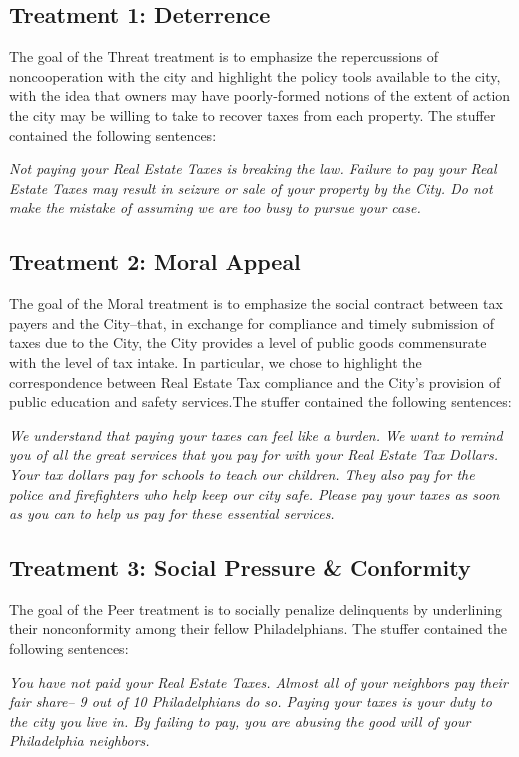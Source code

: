 \documentclass[12pt,titlepage]{article}
\begin{document}
\subsection{Treatment 1: Deterrence}

The goal of the Threat treatment is to emphasize the repercussions of
noncooperation with the city and highlight the policy tools available
to the city, with the idea that owners may have poorly-formed notions
of the extent of action the city may be willing to take to recover
taxes from each property. The stuffer contained the following sentences:

{\it Not paying your Real Estate Taxes is breaking the law. Failure to pay your Real Estate Taxes may result in
seizure or sale of your property by the City. Do not make the mistake of assuming we are too busy
to pursue your case.}

\subsection{Treatment 2: Moral Appeal}

The goal of the Moral treatment is to emphasize the social contract
between tax payers and the City--that, in exchange for compliance and
timely submission of taxes due to the City, the City provides a level
of public goods commensurate with the level of tax intake. In
particular, we chose to highlight the correspondence between Real
Estate Tax compliance and the City's provision of public education and
safety services.The stuffer contained the following sentences:

{\it We understand that paying your taxes
can feel like a burden. We want to remind you of all the great services that
you pay for with your Real Estate Tax Dollars. Your tax dollars pay for schools to teach our children.
They also pay for the police and firefighters who help keep our city safe.
Please pay your taxes as soon as you can to help us pay for these
essential services.}

\subsection{Treatment 3: Social Pressure \& Conformity}

The goal of the Peer treatment is to socially penalize delinquents
by underlining their nonconformity among their fellow Philadelphians.
The stuffer contained the following sentences:

{\it You have not paid your Real Estate Taxes. Almost all of your neighbors pay their fair share--
9 out of 10 Philadelphians do so. Paying your taxes is your duty to the city
you live in. By failing to pay, you are abusing the good will of your
Philadelphia neighbors.}
\end{document}
